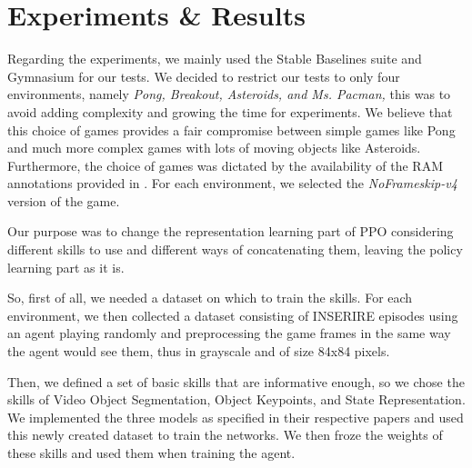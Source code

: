 
\section{Experiments \& Results}
\label{sec:experiments}
Regarding the experiments, we mainly used the Stable Baselines suite \cite{stable-baselines} and Gymnasium \cite{towers_gymnasium_2023} for our tests.
We decided to restrict our tests to only four environments, namely \textit{Pong, Breakout, Asteroids, and Ms. Pacman,} this was to avoid adding complexity and growing the time for experiments. We believe that this choice of games provides a fair compromise between simple games like Pong and much more complex games with lots of moving objects like Asteroids.
Furthermore, the choice of games was dictated by the availability of the RAM annotations provided in \cite{anand2019unsupervised}.
For each environment, we selected the \textit{NoFrameskip-v4} version of the game.

Our purpose was to change the representation learning part of PPO considering different skills to use and different ways of concatenating them, leaving the policy learning part as it is.

So, first of all, we needed a dataset on which to train the skills. For each environment, we then collected a dataset consisting of INSERIRE episodes using an agent playing randomly and preprocessing the game frames in the same way the agent would see them, thus in grayscale and of size 84x84 pixels.

Then, we defined a set of basic skills that are informative enough, so we chose the skills of Video Object Segmentation, Object Keypoints, and State Representation.
We implemented the three models as specified in their respective papers and used this newly created dataset to train the networks.
We then froze the weights of these skills and used them when training the agent.

